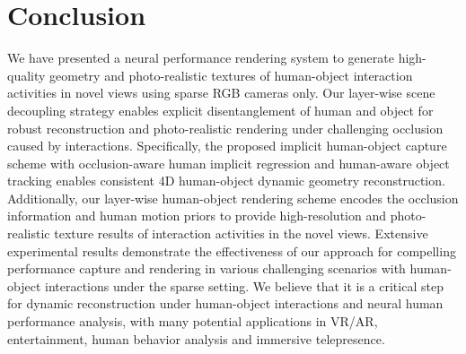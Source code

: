 \section{Conclusion}
We have presented a neural performance rendering system to generate high-quality geometry and photo-realistic textures of human-object interaction activities in novel views using sparse RGB cameras only. 
%
Our layer-wise scene decoupling strategy enables explicit disentanglement of human and object for robust reconstruction and photo-realistic rendering under challenging occlusion caused by interactions. 
%
Specifically, the proposed implicit human-object capture scheme with occlusion-aware human implicit regression and human-aware object tracking enables consistent 4D human-object dynamic geometry reconstruction.
%
Additionally, our layer-wise human-object rendering scheme encodes the occlusion information and human motion priors to provide high-resolution and photo-realistic texture results of interaction activities in the novel views.
%
Extensive experimental results demonstrate the effectiveness of our approach for compelling performance capture and rendering in various challenging scenarios with human-object interactions under the sparse setting.
%
We believe that it is a critical step for dynamic reconstruction under human-object interactions and neural human performance analysis, with many potential applications in VR/AR, entertainment,  human behavior analysis and immersive telepresence.



